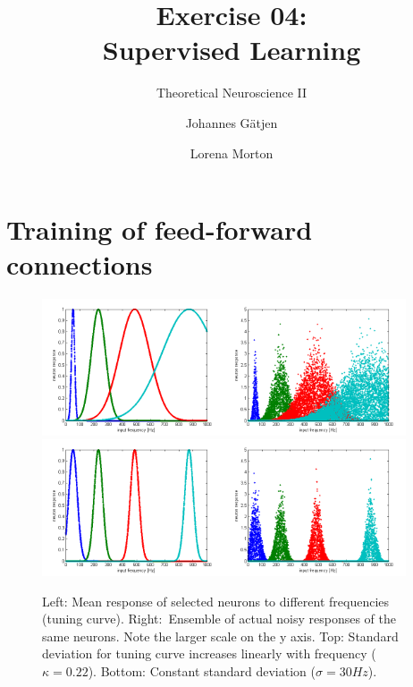 \documentclass{scrartcl}
\title{Exercise 04:\\Supervised Learning}
\subtitle{Theoretical Neuroscience II}
\author{Johannes G\"atjen \and Lorena Morton}
\begin{document}
\maketitle

\section{Training of feed-forward connections}
\begin{figure}[h]
\centering
\includegraphics[trim = {0.8cm 0 0.5cm 0.2cm}, width=0.48\textwidth, clip]{../pics/lin_mean}\includegraphics[trim = {0.8cm 0 0.5cm 0.2cm}, width=0.48\textwidth, clip]{../pics/lin_noise}\\
\includegraphics[trim = {0.8cm 0 0.5cm 0.2cm}, width=0.48\textwidth, clip]{../pics/cons_mean}\includegraphics[trim = {0.8cm 0 0.5cm 0.2cm}, width=0.48\textwidth, clip]{../pics/cons_noise}
\caption{Left: Mean response of selected neurons to different frequencies (tuning curve). Right:~Ensemble of actual noisy responses of the same neurons. Note the larger scale on the y axis. Top: Standard deviation for tuning curve increases linearly with frequency ($\kappa = 0.22$). Bottom: Constant standard deviation ($\sigma = 30\si{Hz}$).}
\end{figure}
\end{document}
